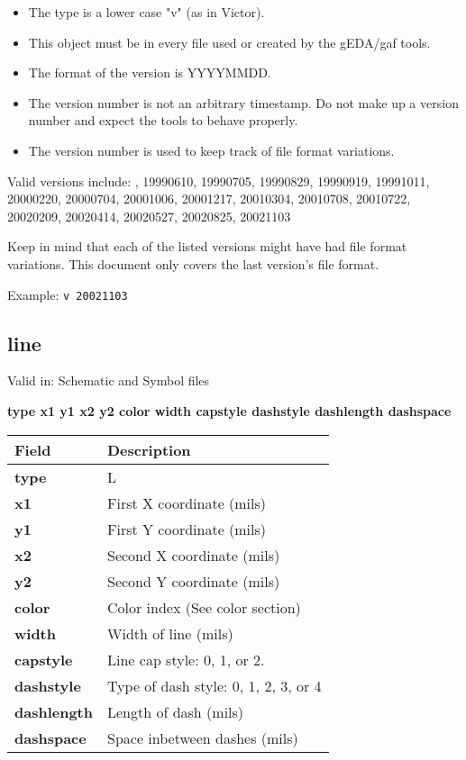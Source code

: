 \documentclass{article}
\begin{document}
\begin{itemize}
\item The type is a lower case "v" (as in Victor).
\item This object must be in every file used or created by the gEDA/gaf tools.
\item The format of the version is YYYYMMDD.  
\item The version number is not an arbitrary timestamp.  Do not make up a 
      version number and expect the tools to behave properly.  
\item The version number is used to keep track of file format variations.
\end{itemize}

Valid versions include: , 19990610, 19990705, 19990829, 19990919, 19991011, 20000220, 20000704,
20001006, 20001217, 20010304, 20010708, 20010722, 20020209, 20020414, 20020527,
20020825, 20021103

Keep in mind that each of the listed versions might have had file format
variations.  This document only covers the last version's file format.

Example: \newline
{\tt v 20021103}


\subsection{line}

Valid in: Schematic and Symbol files

{\bf type x1 y1 x2 y2 color width capstyle dashstyle dashlength dashspace}

\begin{table}[h]
\begin{tabular}{|l|l|} \hline
Field & Description \\ \hline \hline
{\bf type} & L \\ \hline
{\bf x1} & First X coordinate (mils) \\ \hline
{\bf y1} & First Y coordinate (mils) \\ \hline
{\bf x2} & Second X coordinate (mils) \\ \hline
{\bf y2} & Second Y coordinate (mils) \\ \hline
{\bf color} & Color index (See color section) \\ \hline
{\bf width} & Width of line (mils) \\ \hline
{\bf capstyle} & Line cap style: 0, 1, or 2. \\ \hline
{\bf dashstyle} & Type of dash style: 0, 1, 2, 3, or 4 \\ \hline
{\bf dashlength} & Length of dash (mils) \\ \hline
{\bf dashspace} & Space inbetween dashes (mils) \\ \hline
\end{tabular}
\end{table}
\end{document}
